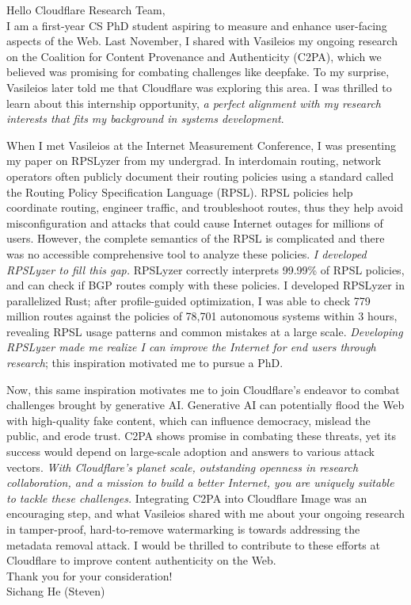 \documentclass[letterpaper,12pt]{article}
\begin{document}
Hello Cloudflare Research Team,
\\

I am a first-year CS PhD student aspiring to measure and
enhance user-facing aspects of the Web. Last November, I shared with
Vasileios my ongoing research on the Coalition for Content Provenance and
Authenticity (C2PA), which we believed was promising for
combating challenges like deepfake.
To my surprise, Vasileios later told me that
Cloudflare was exploring this area.
I was thrilled to learn about this internship opportunity,
\textit{a perfect alignment with my research interests that
fits my background in systems development}.

When I met Vasileios at the Internet Measurement Conference,
I was presenting my paper on RPSLyzer from my undergrad.
In interdomain routing,
network operators often publicly document their routing policies using a
standard called the Routing Policy Specification Language (RPSL).
RPSL policies help coordinate routing, engineer traffic, and
troubleshoot routes, thus they help avoid misconfiguration and attacks that
could cause Internet outages for millions of users.
However, the complete semantics of the RPSL is complicated and
there was no accessible comprehensive tool to analyze these policies.
\textit{I developed RPSLyzer to fill this gap.}
RPSLyzer correctly interprets 99.99\% of RPSL policies, and can check if
BGP routes comply with these policies.
I developed RPSLyzer in parallelized Rust; after profile-guided optimization,
I was able to check 779 million routes against the policies of
78,701 autonomous systems within 3 hours, revealing RPSL usage patterns and
common mistakes at a large scale.
\textit{Developing RPSLyzer made me realize I can improve the Internet for
end users through research}; this inspiration motivated me to pursue a PhD.

Now, this same inspiration motivates me to join Cloudflare's endeavor to
combat challenges brought by generative AI.
Generative AI can potentially flood the Web with high-quality fake content,
which can influence democracy, mislead the public, and erode trust.
C2PA shows promise in combating these threats, yet its success would depend on
large-scale adoption and answers to various attack vectors.
\textit{With Cloudflare's planet scale, outstanding openness in
research collaboration, and a mission to build a better Internet,
you are uniquely suitable to tackle these challenges.}
Integrating C2PA into Cloudflare Image was an encouraging step, and
what Vasileios shared with me about your ongoing research in tamper-proof,
hard-to-remove watermarking is towards addressing the metadata removal attack.
I would be thrilled to contribute to these efforts at Cloudflare to
improve content authenticity on the Web.
\\

Thank you for your consideration!\\
Sichang He (Steven)
\end{document}
